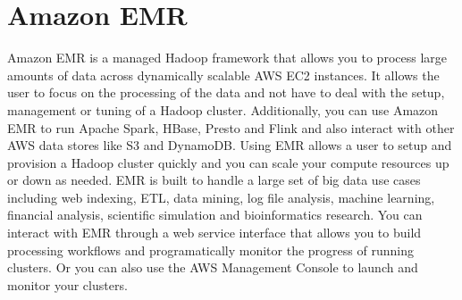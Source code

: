 \section{Amazon EMR}

Amazon EMR \cite{hid-sp18-521-AmazonEMR} is a managed Hadoop framework 
that allows you to process large amounts of data across dynamically 
scalable AWS EC2 instances. It allows the user to focus on the processing
of the data and not have to deal with the setup, management or tuning of 
a Hadoop cluster. Additionally, you can use Amazon EMR to run Apache 
Spark, HBase, Presto and Flink and also interact with other AWS data 
stores like S3 and DynamoDB. Using EMR allows a user to setup and provision 
a Hadoop cluster quickly and you can scale your compute resources up or 
down as needed. EMR is built to handle a large set of big data use cases 
including web indexing, ETL, data mining, log file analysis, machine 
learning, financial analysis, scientific simulation and bioinformatics 
research. You can interact with EMR through a web service interface that
allows you to build processing workflows and programatically monitor 
the progress of running clusters. Or you can also use the AWS Management 
Console to launch and monitor your clusters.
